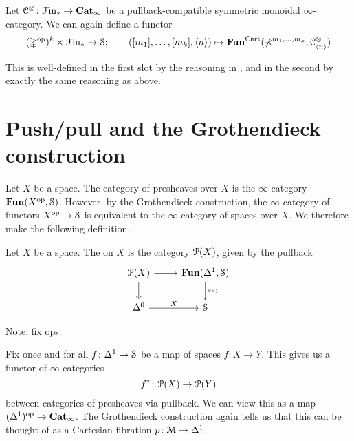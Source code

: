 \documentclass[main.tex]{subfiles}
\begin{document}
Let $\category{C}^{\otimes}\colon \Finp \to \ICat$ be a pullback-compatible symmetric monoidal $\infty$-category. We can again define a functor
\begin{equation*}
  (\D\op)^{k} \times \Finp \to \S;\qquad ([m_{1}], \ldots, [m_{k}], \langle n \rangle) \mapsto \Fun^{\Cart}(\Sig^{m_{1}, \ldots, m_{k}}, \category{C}^{\otimes}_{\langle n \rangle})
\end{equation*}

This is well-defined in the first slot by the reasoning in \cite[Cor. 5.12]{1409.0837}, and in the second by exactly the same reasoning as above.

\section{Push/pull and the Grothendieck construction}
\label{sec:push_pull_and_the_grothendieck_construction}

Let $X$ be a space. The category of presheaves over $X$ is the $\infty$-category $\Fun(X\op,  \S)$. However, by the Grothendieck construction, the $\infty$-category of functors $X\op \to \S$ is equivalent to the $\infty$-category of spaces over $X$. We therefore make the following definition.

\begin{definition}
  \label{def:category_of_presheaves}
  Let $X$ be a space. The  on $X$ is the category $\P(X)$, given by the pullback
  \begin{equation*}
    \begin{tikzcd}
      \P(X)
      \arrow[r]
      \arrow[d]
      & \Fun(\Delta^{1}, \S)
      \arrow[d, "\ev_{1}"]
      \\
      \Delta^{0}
      \arrow[r, "X"]
      & \S
    \end{tikzcd}
  \end{equation*}
\end{definition}

Note: fix ops.

Fix once and for all $f\colon \Delta^{1} \to \S$ be a map of spaces $f\colon X \to Y$. This gives us a functor of $\infty$-categories
\begin{equation*}
  f^{*}\colon \P(X) \to \P(Y)
\end{equation*}
between categories of presheaves via pullback. We can view this as a map $(\Delta^{1})\op \to \ICat$. The Grothendieck construction again tells us that this can be thought of as a Cartesian fibration $p\colon \category{M} \to \Delta^{1}$.
\end{document}
